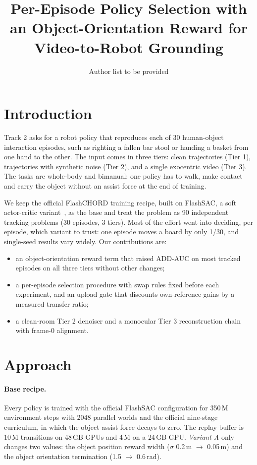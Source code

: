\documentclass[10pt]{nvidiaextabstract}
\title{Per-Episode Policy Selection with an Object-Orientation Reward for Video-to-Robot Grounding}
\author[1]{Author list to be provided}
\affil[1]{maniphysAI lab}
\begin{document}
\maketitle


\section{Introduction}
\label{sec:intro}

Track 2 asks for a robot policy that reproduces each of 30 human-object interaction episodes, such as righting a fallen bar stool or handing a basket from one hand to the other.
The input comes in three tiers: clean trajectories (Tier 1), trajectories with synthetic noise (Tier 2), and a single exocentric video (Tier 3).
The tasks are whole-body and bimanual: one policy has to walk, make contact and carry the object without an assist force at the end of training.

We keep the official FlashCHORD training recipe, built on FlashSAC, a soft actor-critic variant~\cite{haarnoja2018sac}, as the base and treat the problem as 90 independent tracking problems (30 episodes, 3 tiers).
Most of the effort went into deciding, per episode, which variant to trust: one episode moves a board by only 1/30, and single-seed results vary widely.
Our contributions are:
\begin{itemize}
  \item an object-orientation reward term that raised ADD-AUC on most tracked episodes on all three tiers without other changes;
  \item a per-episode selection procedure with swap rules fixed before each experiment, and an upload gate that discounts own-reference gains by a measured transfer ratio;
  \item a clean-room Tier 2 denoiser and a monocular Tier 3 reconstruction chain with frame-0 alignment.
\end{itemize}

\section{Approach}
\label{sec:approach}

\paragraph{Base recipe.}
Every policy is trained with the official FlashSAC configuration for 350\,M environment steps with 2048 parallel worlds and the official nine-stage curriculum, in which the object assist force decays to zero.
The replay buffer is 10\,M transitions on 48\,GB GPUs and 4\,M on a 24\,GB GPU.
\emph{Variant A} only changes two values: the object position reward width ($\sigma$ 0.2\,m $\rightarrow$ 0.05\,m) and the object orientation termination (1.5 $\rightarrow$ 0.6\,rad).
\end{document}
